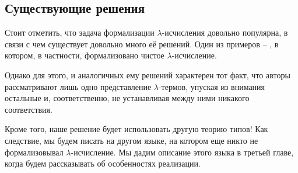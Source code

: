 \subsection{Существующие решения}

Стоит отметить, что задача формализации $\lambda$-исчисления довольно популярна, в связи с чем существует довольно много её решений. Один из примеров -- \cite{lambdaForm}, в котором, в частности, формализовано чистое $\lambda$-исчисление.

Однако для этого, и аналогичных ему решений характерен тот факт, что авторы рассматривают лишь одно представление $\lambda$-термов, упуская из внимания остальные и, соответственно, не устанавливая между ними никакого соответствия.

Кроме того, наше решение будет использовать другую теорию типов! Как следствие, мы будем писать на другом языке, на котором еще никто не формализовывал $\lambda$-исчисление. Мы дадим описание этого языка в третьей главе, когда будем рассказывать об особенностях реализации.
